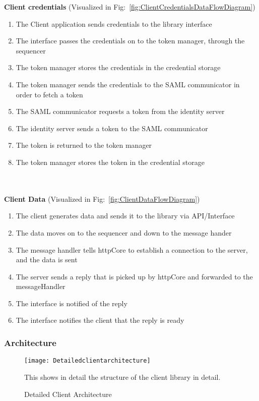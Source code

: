 	\textbf{Client credentials} (Visualized in Fig:~\ref{fig:ClientCredentialsDataFlowDiagram})
		\begin{enumerate}
			\item The Client application sends credentials to the library interface
			\item The interface passes the credentials on to the token manager, through the sequencer
			\item The token manager stores the credentials in the credential storage
			\item The token manager sends the credentials to the SAML communicator in order to fetch a token
			\item The SAML communicator requests a token from the identity server
			\item The identity server sends a token to the SAML communicator
			\item The token is returned to the token manager
			\item The token manager stores the token in the credential storage
		\end{enumerate}
		\\\\	
		\textbf{Client Data} (Visualized in Fig:~\ref{fig:ClientDataFlowDiagram})
		\begin{enumerate}
			\item The client generates data and sends it to the library via API/Interface
			\item The data moves on to the sequencer and down to the message hander
			\item The message handler tells \gls{httpCore} to establish a connection to the server, and the data is sent
			\item The server sends a reply that is picked up by \gls{httpCore} and forwarded to the messageHandler
			\item The interface is notified of the reply
			\item The interface notifies the client that the reply is ready
		\end{enumerate}
		
	\subsubsection{Architecture}\label{client architecture}
		\begin{figure}[h]
			\centering	
			\texttt{[image: Detailedclientarchitecture]}
			\caption{Detailed Client Architecture}
			This shows in detail the structure of the client library in detail. 
			\label{fig:DetailedClientArchitecture}
		\end{figure}

